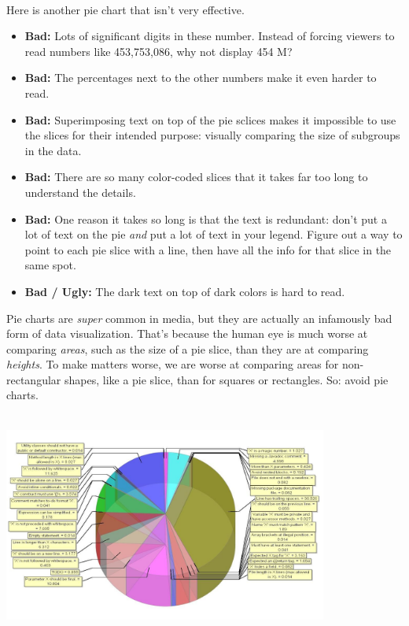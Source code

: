 \documentclass[
]{book}
\providecommand{\tightlist}{%
  \setlength{\itemsep}{0pt}\setlength{\parskip}{0pt}}
\begin{document}
~

Here is another pie chart that isn't very effective.

\begin{itemize}
\tightlist
\item
  \textbf{Bad:} Lots of significant digits in these number. Instead of forcing viewers to read numbers like 453,753,086, why not display 454 M?\\
\item
  \textbf{Bad:} The percentages next to the other numbers make it even harder to read.
\item
  \textbf{Bad:} Superimposing text on top of the pie sclices makes it impossible to use the slices for their intended purpose: visually comparing the size of subgroups in the data.
\item
  \textbf{Bad:} There are so many color-coded slices that it takes far too long to understand the details.
\item
  \textbf{Bad:} One reason it takes so long is that the text is redundant: don't put a lot of text on the pie \emph{and} put a lot of text in your legend. Figure out a way to point to each pie slice with a line, then have all the info for that slice in the same spot.\\
\item
  \textbf{Bad / Ugly:} The dark text on top of dark colors is hard to read.
\end{itemize}

Pie charts are \emph{super} common in media, but they are actually an infamously bad form of data visualization. That's because the human eye is much worse at comparing \emph{areas}, such as the size of a pie slice, than they are at comparing \emph{heights}. To make matters worse, we are worse at comparing areas for non-rectangular shapes, like a pie slice, than for squares or rectangles. So: avoid pie charts.

~\\

\includegraphics[width=0.8\textwidth,height=\textheight]{img/vis6.jpg}
\end{document}

